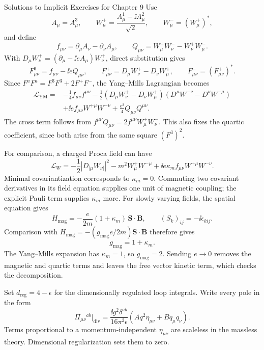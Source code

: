 \begin{bankssolutions}{Solutions to Implicit Exercises for Chapter 9}
Use
\[
  A_\mu=A^3_\mu,\qquad
  W^+_\mu=\frac{A^1_\mu-\ii A^2_\mu}{\sqrt2},\qquad
  W^-_\mu=(W^+_\mu)^*,
\]
and define
\[
  f_{\mu\nu}=\partial_\mu A_\nu-\partial_\nu A_\mu,\qquad
  Q_{\mu\nu}=W^+_\mu W^-_\nu-W^+_\nu W^-_\mu.
\]
With $D_\mu W^+_\nu=(\partial_\mu-\ii eA_\mu)W^+_\nu$, direct substitution
gives
\[
  F^3_{\mu\nu}=f_{\mu\nu}-\ii eQ_{\mu\nu},\qquad
  F^+_{\mu\nu}=D_\mu W^+_\nu-D_\nu W^+_\mu,\qquad
  F^-_{\mu\nu}=(F^+_{\mu\nu})^*.
\]
Since
$F^aF^a=F^3F^3+2F^+F^-$, the Yang--Mills Lagrangian becomes
\begin{align*}
  \mathcal L_{\mathrm{YM}}={}&-\frac14f_{\mu\nu}f^{\mu\nu}
  -\frac12
  (D_\mu W^+_\nu-D_\nu W^+_\mu)
  (D^\mu W^{-\nu}-D^\nu W^{-\mu})\\
  &+\ii e f_{\mu\nu}W^{+\mu}W^{-\nu}
  +\frac{e^2}{4}Q_{\mu\nu}Q^{\mu\nu}.
\end{align*}
The cross term follows from
$f^{\mu\nu}Q_{\mu\nu}=2f^{\mu\nu}W^+_\mu W^-_\nu$.
This also fixes the quartic coefficient, since both arise from the same
square $(F^3)^2$.

For comparison, a charged Proca field can have
\[
  \mathcal L_W=-\frac12|D_{[\mu}W_{\nu]}|^2-m^2W^+_\mu W^{-\mu}
  +\ii e\kappa_m f_{\mu\nu}W^{+\mu}W^{-\nu}.
\]
Minimal covariantization corresponds to $\kappa_m=0$.  Commuting two covariant
derivatives in its field equation supplies one unit of magnetic coupling; the
explicit Pauli term supplies $\kappa_m$ more.  For slowly varying fields, the
spatial equation gives
\[
  H_{\mathrm{mag}}=
  -\frac{e}{2m}(1+\kappa_m)\,
  \mathbf S\mathbin{\cdot}\mathbf B,
  \qquad (S_k)_{ij}=-\ii\epsilon_{kij}.
\]
Comparison with
$H_{\mathrm{mag}}=-(g_{\mathrm{mag}}e/2m)\mathbf S\cdot\mathbf B$
therefore gives
\[
  g_{\mathrm{mag}}=1+\kappa_m.
\]
The Yang--Mills expansion has $\kappa_m=1$, so
$g_{\mathrm{mag}}=2$.  Sending $e\to0$ removes the magnetic and quartic
terms and leaves the free vector kinetic term, which checks the decomposition.

Set $d_{\mathrm{reg}}=4-\epsilon$ for the dimensionally regulated loop
integrals.
Write every pole in the form
\[
  \Pi_{\mu\nu}{}^{ab}\big|_{\mathrm{div}}
  =\frac{\ii g^2\delta^{ab}}{16\pi^2\epsilon}
  \left(Aq^2\eta_{\mu\nu}+Bq_\mu q_\nu\right).
\]
Terms proportional to a momentum-independent $\eta_{\mu\nu}$ are scaleless in
the massless theory.  Dimensional regularization sets them to zero.


\end{bankssolutions}

